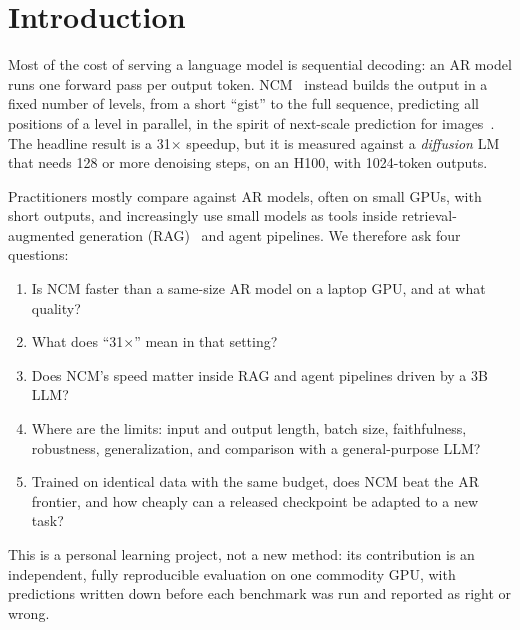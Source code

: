 \documentclass[11pt]{article}
\begin{document}
\begin{abstract}
diverse as an in-domain AR model's, but with 1.7$\times$ the perplexity and lower MAUVE (0.80
vs.\ 0.95).
When we train both sides ourselves on identical TinyStories data, a 35M NCM is about
20$\times$ faster than AR models of 1.9--35.9M parameters but scores MAUVE 0.006 against
0.59--0.92, consistently over three seeds at 25M. An official-style level schedule repairs the
finest level but not the coarse ones, and cheaper attention in the generator does not help.
Finally, rank-16 LoRA adapts the released XSum NCM to SAMSum within 0.9 ROUGE-L of full
fine-tuning, though it still trails BART by 14 points.
All code, outputs and per-example logs are released.
\end{abstract}

\section{Introduction}
Most of the cost of serving a language model is sequential decoding: an AR model runs one
forward pass per output token. NCM~\citep{ncm2026} instead builds the output in a fixed
number of levels, from a short ``gist'' to the full sequence, predicting all positions of a
level in parallel, in the spirit of next-scale prediction for images~\citep{var2024}. The
headline result is a 31$\times$ speedup, but it is measured against a \emph{diffusion} LM
that needs 128 or more denoising steps, on an H100, with 1024-token outputs.

Practitioners mostly compare against AR models, often on small GPUs, with short outputs,
and increasingly use small models as tools inside retrieval-augmented generation
(RAG)~\citep{rag2020} and agent pipelines. We therefore ask four questions:
\begin{enumerate}
  \item Is NCM faster than a same-size AR model on a laptop GPU, and at what quality?
  \item What does ``31$\times$'' mean in that setting?
  \item Does NCM's speed matter inside RAG and agent pipelines driven by a 3B LLM?
  \item Where are the limits: input and output length, batch size, faithfulness, robustness,
        generalization, and comparison with a general-purpose LLM?
  \item Trained on identical data with the same budget, does NCM beat the AR frontier, and
        how cheaply can a released checkpoint be adapted to a new task?
\end{enumerate}
This is a personal learning project, not a new method: its contribution is an
independent, fully reproducible evaluation on one commodity GPU, with predictions written
down before each benchmark was run and reported as right or wrong.
\end{document}
